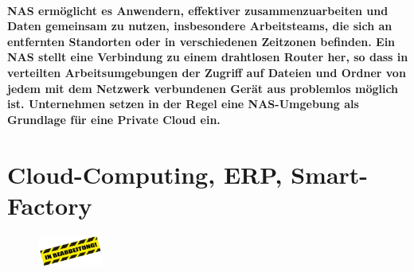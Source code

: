 \documentclass[a4paper]{article}
\begin{document}
    \paragraph{\color{codegreen}NAS ermöglicht es Anwendern, effektiver zusammenzuarbeiten und Daten gemeinsam zu nutzen, insbesondere Arbeitsteams, die sich an entfernten Standorten oder in verschiedenen Zeitzonen befinden. Ein NAS stellt eine Verbindung zu einem drahtlosen Router her, so dass in verteilten Arbeitsumgebungen der Zugriff auf Dateien und Ordner von jedem mit dem Netzwerk verbundenen Gerät aus problemlos möglich ist. Unternehmen setzen in der Regel eine NAS-Umgebung als Grundlage für eine Private Cloud ein.}
    \section{Cloud-Computing, ERP, Smart-Factory}\label{sec:cloud-computing-erp-smart-factory}

    \begin{center}
        \begin{figure}[H]
            \centering
            \includegraphics[height=1cm]{media/s_111}\label{fig:bearb6}
        \end{figure}
    \end{center}
\end{document}
